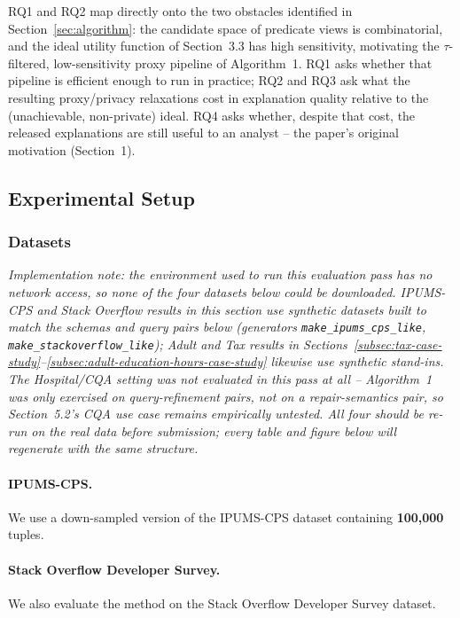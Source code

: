 RQ1 and RQ2 map directly onto the two obstacles identified in
Section~\ref{sec:algorithm}: the candidate space of predicate views is
combinatorial, and the ideal utility function of Section~3.3 has high
sensitivity, motivating the $\tau$-filtered, low-sensitivity proxy pipeline
of Algorithm~1. RQ1 asks whether that pipeline is efficient enough to run
in practice; RQ2 and RQ3 ask what the resulting proxy/privacy relaxations
cost in explanation quality relative to the (unachievable, non-private)
ideal. RQ4 asks whether, despite that cost, the released explanations are
still useful to an analyst -- the paper's original motivation
(Section~1).

\subsection{Experimental Setup}
\label{subsec:experimental-setup}


\subsubsection{Datasets}

\textit{Implementation note: the environment used to run this evaluation
pass has no network access, so none of the four datasets below could be
downloaded. IPUMS-CPS and Stack Overflow results in this section use
synthetic datasets built to match the schemas and query pairs below
(generators \texttt{make\_ipums\_cps\_like}, \texttt{make\_stackoverflow\_like});
Adult and Tax results in Sections~\ref{subsec:tax-case-study}--\ref{subsec:adult-education-hours-case-study}
likewise use synthetic stand-ins. The Hospital/CQA setting was not
evaluated in this pass at all -- Algorithm~1 was only exercised on query-refinement
pairs, not on a repair-semantics pair, so Section~5.2's CQA use case
remains empirically untested. All four should be re-run on the real data
before submission; every table and figure below will regenerate with the
same structure.}

\paragraph{IPUMS-CPS.}
We use a down-sampled version of the IPUMS-CPS dataset containing
\textbf{100,000} tuples.

\paragraph{Stack Overflow Developer Survey.}
We also evaluate the method on the Stack Overflow Developer Survey dataset.


